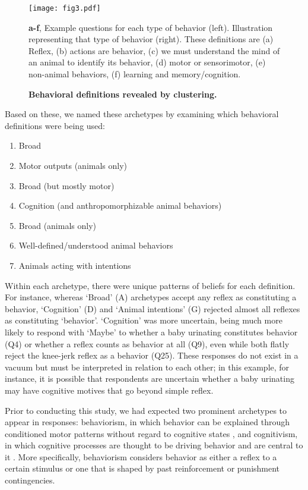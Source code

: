 \documentclass[a4paper, 11pt]{article}
\begin{document}
\begin{figure}
\centerline{\texttt{[image: fig3.pdf]}}
\caption{\textbf{Behavioral definitions revealed by clustering.}} \textbf{a-f}, Example questions for each type of behavior (left). Illustration representing that type of behavior (right). These definitions are (a) Reflex, (b) actions are behavior, (c) we must understand the mind of an animal to identify its behavior, (d) motor or sensorimotor, (e) non-animal behaviors, (f) learning and memory/cognition.
\end{figure}

Based on these, we named these archetypes by examining which behavioral definitions were being used:

  \begin{enumerate}[label=\Alph*]
    \item Broad
    
    \item Motor outputs (animals only)

    \item Broad (but mostly motor)

    \item Cognition (and anthropomorphizable animal behaviors)
    
    \item Broad (animals only)
    
    \item Well-defined/understood animal behaviors

    \item Animals acting with intentions
\end{enumerate}

Within each archetype, there were unique patterns of beliefs for each definition. For instance, whereas `Broad' (A) archetypes accept any reflex as constituting a behavior, `Cognition' (D) and `Animal intentions' (G) rejected almost all reflexes as constituting `behavior'.  `Cognition' was more uncertain, being much more likely to respond with `Maybe' to whether a baby urinating constitutes behavior (Q4) or whether a reflex counts as behavior at all (Q9), even while both flatly reject the knee-jerk reflex as a behavior (Q25). These responses do not exist in a vacuum but must be interpreted in relation to each other; in this example, for instance, it is possible that respondents are uncertain whether a baby urinating may have cognitive motives that go beyond simple reflex.

Prior to conducting this study, we had expected two prominent archetypes to appear in responses: behaviorism, in which behavior can be explained through conditioned motor patterns without regard to cognitive states \cite{skinner1986behaviorism, skinner2011behaviorism}, and cognitivism, in which cognitive processes are thought to be driving behavior and are central to it \cite{haugeland1978nature}. More specifically, behaviorism \cite{skinner1986behaviorism, skinner2011behaviorism} considers behavior as either a reflex to a certain stimulus \cite{dewey1896reflex} or one that is shaped by past reinforcement or punishment contingencies.
\end{document}
